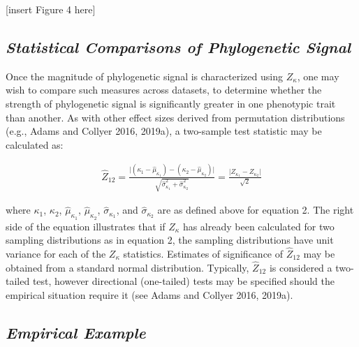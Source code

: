 \documentclass[
]{article}
\begin{document}
{[}insert Figure 4 here{]}

\hypertarget{statistical-comparisons-of-phylogenetic-signal}{%
\subsection{\texorpdfstring{\emph{Statistical Comparisons of
Phylogenetic
Signal}}{Statistical Comparisons of Phylogenetic Signal}}\label{statistical-comparisons-of-phylogenetic-signal}}

Once the magnitude of phylogenetic signal is characterized using
\(Z_\kappa\), one may wish to compare such measures across datasets, to
determine whether the strength of phylogenetic signal is significantly
greater in one phenotypic trait than another. As with other effect sizes
derived from permutation distributions (e.g., Adams and Collyer 2016,
2019a), a two-sample test statistic may be calculated as:

\begin{align}
  \hat{Z}_{12}=\frac{\lvert{(\kappa_{1}-\hat\mu_{\kappa_1})-(\kappa_{2}-\hat\mu_{\kappa_2})}\rvert}{\sqrt{\hat\sigma^2_{\kappa_1}+\hat\sigma^2_{\kappa_2}}} = \frac{\lvert Z_{\kappa_1} - Z_{\kappa_2}\rvert}{\sqrt{2}}
\end{align}

where \(\kappa_1\), \(\kappa_2\), \(\hat\mu_{\kappa_1}\),
\(\hat\mu_{\kappa_2}\), \(\hat\sigma_{\kappa_1}\), and
\(\hat\sigma_{\kappa_2}\) are as defined above for equation 2. The right
side of the equation illustrates that if \(Z_\kappa\) has already been
calculated for two sampling distributions as in equation 2, the sampling
distributions have unit variance for each of the \(Z_\kappa\)
statistics. Estimates of significance of \(\hat{Z}_{12}\) may be
obtained from a standard normal distribution. Typically,
\(\hat{Z}_{12}\) is considered a two-tailed test, however directional
(one-tailed) tests may be specified should the empirical situation
require it (see Adams and Collyer 2016, 2019a). \hfill\break

\hypertarget{empirical-example}{%
\subsection{\texorpdfstring{\emph{Empirical
Example}}{Empirical Example}}\label{empirical-example}}
\end{document}
